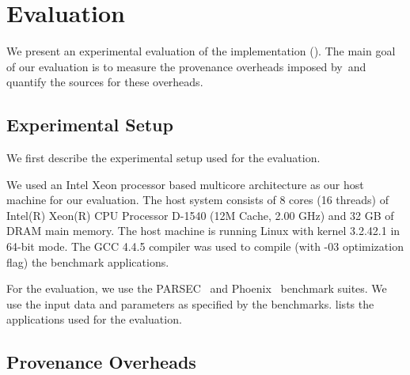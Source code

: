 \section{Evaluation}
\label{sec:evaluation}

We present an experimental evaluation of the \projecttitle implementation (). The main goal of our evaluation is to measure the provenance overheads imposed by~\projecttitle and quantify the sources for these overheads. 

\subsection{Experimental Setup}
We first describe the experimental setup used for the evaluation.

 We used an Intel Xeon processor based 
multicore architecture as our host machine for our evaluation. The
host system consists of 8 cores (16 threads) of Intel(R) Xeon(R) CPU Processor D-1540 
(12M Cache, 2.00 GHz) and 32 GB of DRAM main memory. The host
machine is running Linux with kernel 3.2.42.1 in 64-bit mode. 
The GCC 4.4.5 compiler was used to
compile (with -$03$ optimization flag) the benchmark applications. 

  For the evaluation, we use the PARSEC~\cite{parsec} and
Phoenix~\cite{phoenix} benchmark suites. We use
the input data and parameters as specified by the
benchmarks.  lists the applications used for the
evaluation.  

%

\subsection{Provenance Overheads}



